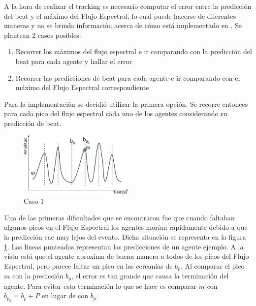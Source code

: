 \documentclass[12pt,a4paper,titlepage]{report}
\begin{document}
A la hora de realizar el tracking es necesario computar el error entre la predicción del beat y el máximo del Flujo Espectral, lo cual puede hacerse de diferentes maneras y no se brinda información acerca de cómo está implementado en \cite{bib:el_posta}. Se plantean 2 casos posibles:
\begin{enumerate}
\item Recorrer los máximos del flujo espectral e ir comparando con la predicción del beat para cada agente y hallar el error
\item Recorrer las predicciones de beat para cada agente e ir comparando con el máximo del Flujo Espectral correspondiente
\end{enumerate}
Para la implementación se decidió utilizar la primera opción. Se recorre entonces para cada pico del flujo espectral cada uno de los agentes considerando su predicción de beat.

\begin{figure}
	\vspace{-25pt}
	\begin{center}
	\includegraphics[width=0.5\textwidth]{./pics/caso1.png}
	\end{center}
	\vspace{-20pt}
	\caption{Caso 1}
	\label{fig:caso1}
\end{figure}

Una de las primeras dificultades que se encontraron fue que cuando faltaban algunos picos en el Flujo Espectral los agentes morían rápidamente debido a que la predicción cae muy lejos del evento. Dicha situación se representa en la figura \ref{fig:caso1}. Las líneas punteadas representan las predicciones de un agente ejemplo. A la vista está que el agente aproxima de buena manera a todos de los picos del Flujo Espectral, pero parece faltar un pico en las cercanías de $b_p$. Al comparar el pico $m$ con la predicción $b_p$, el error es tan grande que causa la terminación del agente. Para evitar esta terminación lo que se hace es comparar $m$ con $b_{p_2}=b_p+P$ en lugar de con $b_p$.
\end{document}
